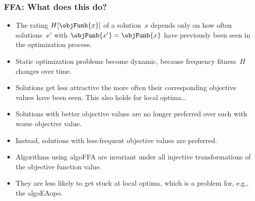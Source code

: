 \documentclass[aspectratio=169,mathserif,notheorems]{beamer}%
\begin{document}
\begin{frame}%
\frametitle{FFA: What does this do?}%
\begin{itemize}%
\item The rating $H[\objFunb{x}]$ of a solution~$x$ depends only on how often solutions~$x'$ with $\objFunb{x'}=\objFunb{x}$ have previously been seen in the optimization process.%
\item<2-> Static optimization problems become dynamic, because frequency fitness~$H$ changes over time.%
\item<3-> Solutions get less attractive the more often their corresponding objective values have been seen. This also holds for local optima\dots%
\item<4-> Solutions with better objective values are no longer preferred over such with worse objective value.%
\item<5-> Instead, solutions with less-frequent objective values are preferred.%
\item<6-> \alert{Algorithms using \gls{algoFFA} are invariant under all injective transformations of the objective function value.}%
\item<7-> They are less likely to get stuck at local optima, which is a problem for, e.g., the \gls{algoEAopo}.%
\end{itemize}%
\end{frame}%
%
\end{document}
